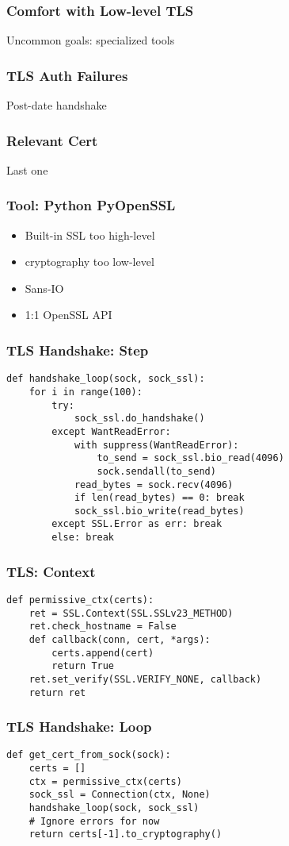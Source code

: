 \begin{frame}
\frametitle{Comfort with Low-level TLS}

Uncommon goals: specialized tools
\end{frame}

\begin{frame}
\frametitle{TLS Auth Failures}
Post-date handshake
\end{frame}

\begin{frame}
\frametitle{Relevant Cert}
Last one
\end{frame}

\begin{frame}
\frametitle{Tool: Python PyOpenSSL}

\begin{itemize}
\item Built-in SSL too high-level
\item cryptography too low-level
\item Sans-IO
\item 1:1 OpenSSL API
\end{itemize}

\end{frame}

\begin{frame}[fragile]
\frametitle{TLS Handshake: Step}
\begin{lstlisting}
def handshake_loop(sock, sock_ssl):
    for i in range(100):
        try:
            sock_ssl.do_handshake()
        except WantReadError:
            with suppress(WantReadError):
                to_send = sock_ssl.bio_read(4096)
                sock.sendall(to_send)
            read_bytes = sock.recv(4096)
            if len(read_bytes) == 0: break
            sock_ssl.bio_write(read_bytes)
        except SSL.Error as err: break
        else: break
\end{lstlisting}
\end{frame}

\begin{frame}[fragile]
\frametitle{TLS: Context}
\begin{lstlisting}
def permissive_ctx(certs):
    ret = SSL.Context(SSL.SSLv23_METHOD)
    ret.check_hostname = False
    def callback(conn, cert, *args):
        certs.append(cert)
        return True
    ret.set_verify(SSL.VERIFY_NONE, callback)
    return ret
\end{lstlisting}
\end{frame}

\begin{frame}[fragile]
\frametitle{TLS Handshake: Loop}
\begin{lstlisting}
def get_cert_from_sock(sock): 
    certs = []
    ctx = permissive_ctx(certs)
    sock_ssl = Connection(ctx, None)
    handshake_loop(sock, sock_ssl)
    # Ignore errors for now
    return certs[-1].to_cryptography()
\end{lstlisting}
\end{frame}

